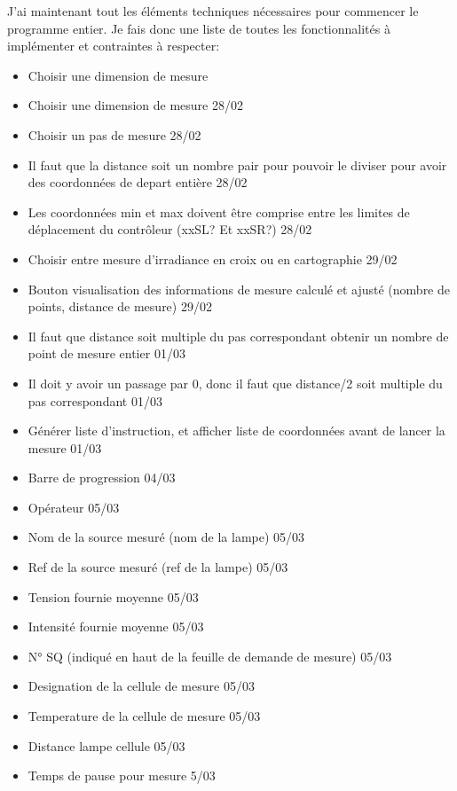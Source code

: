 \documentclass[12pt]{article}
\begin{document}
J'ai maintenant tout les éléments techniques nécessaires pour commencer le programme entier.  
Je fais donc une liste de toutes les fonctionnalités à implémenter et contraintes à respecter:  

\begin{itemize}
	\item [ ] Choisir une dimension de mesure
	\item [ ] Choisir une dimension de mesure  28/02
	\item [ ] Choisir un pas de mesure  28/02
	\item [ ] Il faut que la distance soit un nombre pair pour pouvoir le diviser pour avoir des coordonnées de depart entière  28/02
	\item [ ] Les coordonnées min et max doivent être comprise entre les limites de déplacement du contrôleur (xxSL? Et xxSR?)  28/02
	\item [ ] Choisir entre mesure d'irradiance en croix ou en cartographie 29/02
	\item [ ] Bouton visualisation des informations de mesure calculé et ajusté (nombre de points, distance de mesure)  29/02
	\item [ ] Il faut que distance soit multiple du pas correspondant obtenir un nombre de point de mesure entier  01/03
	\item [ ] Il doit y avoir un passage par 0, donc il faut que distance/2 soit multiple du pas correspondant  01/03
	\item [ ] Générer liste d'instruction, et afficher liste de coordonnées avant de lancer la mesure  01/03
	\item [ ] Barre de progression  04/03
	\item [ ] Opérateur  05/03
	\item [ ] Nom de la source mesuré (nom de la lampe)  05/03
	\item [ ] Ref de la source mesuré (ref de la lampe)  05/03
	\item [ ] Tension fournie moyenne  05/03
	\item [ ] Intensité fournie moyenne  05/03
	\item [ ] N° SQ (indiqué en haut de la feuille de demande de mesure)  05/03
	\item [ ] Designation de la cellule de mesure  05/03
	\item [ ] Temperature de la cellule de mesure  05/03
	\item [ ] Distance lampe cellule  05/03 
	\item [ ] Temps de pause pour mesure  5/03

\end{itemize}
\end{document}
